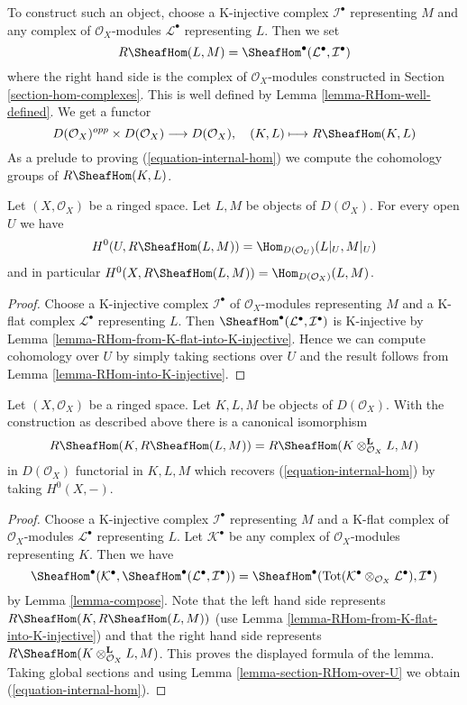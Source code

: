 \medskip\noindent
To construct such an object, choose a K-injective complex
$\mathcal{I}^\bullet$ representing $M$ and any complex of
$\mathcal{O}_X$-modules $\mathcal{L}^\bullet$ representing $L$.
Then we set
$$
R\SheafHom(L, M) = \SheafHom^\bullet(\mathcal{L}^\bullet, \mathcal{I}^\bullet)
$$
where the right hand side is the complex of $\mathcal{O}_X$-modules
constructed in Section \ref{section-hom-complexes}.
This is well defined by Lemma \ref{lemma-RHom-well-defined}.
We get a functor
$$
D(\mathcal{O}_X)^{opp} \times D(\mathcal{O}_X) \longrightarrow D(\mathcal{O}_X),
\quad
(K, L) \longmapsto R\SheafHom(K, L)
$$
As a prelude to proving (\ref{equation-internal-hom})
we compute the cohomology groups of $R\SheafHom(K, L)$.

\begin{lemma}
\label{lemma-section-RHom-over-U}
Let $(X, \mathcal{O}_X)$ be a ringed space. Let $L, M$ be objects
of $D(\mathcal{O}_X)$. For every open $U$ we have
$$
H^0(U, R\SheafHom(L, M)) =
\Hom_{D(\mathcal{O}_U)}(L|_U, M|_U)
$$
and in particular $H^0(X, R\SheafHom(L, M)) = \Hom_{D(\mathcal{O}_X)}(L, M)$.
\end{lemma}

\begin{proof}
Choose a K-injective complex $\mathcal{I}^\bullet$ of
$\mathcal{O}_X$-modules representing $M$ and a K-flat complex
$\mathcal{L}^\bullet$ representing $L$. Then
$\SheafHom^\bullet(\mathcal{L}^\bullet, \mathcal{I}^\bullet)$
is K-injective by Lemma \ref{lemma-RHom-from-K-flat-into-K-injective}.
Hence we can compute cohomology over $U$ by simply taking sections over $U$
and the result follows from Lemma \ref{lemma-RHom-into-K-injective}.
\end{proof}

\begin{lemma}
\label{lemma-internal-hom}
Let $(X, \mathcal{O}_X)$ be a ringed space. Let $K, L, M$ be objects
of $D(\mathcal{O}_X)$. With the construction as described above
there is a canonical isomorphism
$$
R\SheafHom(K, R\SheafHom(L, M)) =
R\SheafHom(K \otimes_{\mathcal{O}_X}^\mathbf{L} L, M)
$$
in $D(\mathcal{O}_X)$ functorial in $K, L, M$
which recovers (\ref{equation-internal-hom}) by taking $H^0(X, -)$.
\end{lemma}

\begin{proof}
Choose a K-injective complex $\mathcal{I}^\bullet$ representing
$M$ and a K-flat complex of $\mathcal{O}_X$-modules $\mathcal{L}^\bullet$
representing $L$. Let $\mathcal{K}^\bullet$ be any complex of
$\mathcal{O}_X$-modules representing $K$. Then
we have
$$
\SheafHom^\bullet(\mathcal{K}^\bullet,
\SheafHom^\bullet(\mathcal{L}^\bullet, \mathcal{I}^\bullet))
=
\SheafHom^\bullet(
\text{Tot}(\mathcal{K}^\bullet \otimes_{\mathcal{O}_X} \mathcal{L}^\bullet),
\mathcal{I}^\bullet)
$$
by Lemma \ref{lemma-compose}.
Note that the left hand side represents
$R\SheafHom(K, R\SheafHom(L, M))$ (use
Lemma \ref{lemma-RHom-from-K-flat-into-K-injective})
and that the right hand side represents
$R\SheafHom(K \otimes_{\mathcal{O}_X}^\mathbf{L} L, M)$.
This proves the displayed formula of the lemma.
Taking global sections and using Lemma \ref{lemma-section-RHom-over-U}
we obtain (\ref{equation-internal-hom}).
\end{proof}

